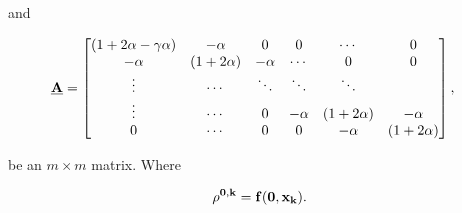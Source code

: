 and 

\begin{align}
\bf{\underline{A}} &= \begin{bmatrix}
           ( 1 + 2\alpha-\gamma\alpha) & -\alpha  &  0 & 0 &  \cdots & 0\\
             -\alpha & ( 1 + 2 \alpha ) & -\alpha & \cdots & 0 & 0\\
           \vdots  &\cdots  & \ddots & \ddots &  \ddots&  \\
            \vdots & \cdots & 0  &  -\alpha & ( 1 + 2 \alpha ) & -\alpha \\
            0 & \cdots &0  & 0 & -\alpha & ( 1 + 2 \alpha )
         \end{bmatrix}
         \label{eq:discretization-matrix},
\end{align}

be an $m\times m$ matrix. Where

\begin{align}
    \bf{\rho^{0,k}} = f(0, x_k). \\
\end{align}







